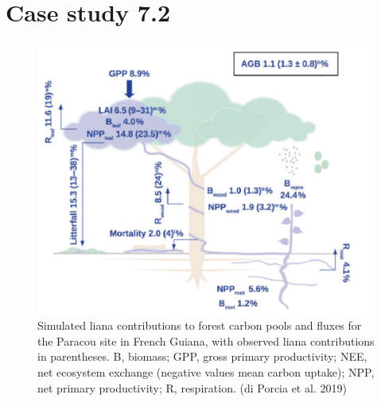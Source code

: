\documentclass[12pt,oneside]{book}
\begin{document}
\section{Case study 7.2}\label{case-study-7.2}

\begin{figure}

{\centering \includegraphics[width=0.8\linewidth]{figures/chap7/f722_porcia1} 

}

\caption{Simulated liana contributions to forest carbon pools and fluxes for the Paracou site in French Guiana, with observed liana contributions in parentheses. B, biomass; GPP, gross primary productivity; NEE, net ecosystem exchange (negative values mean carbon uptake); NPP, net primary productivity; R, respiration. (di Porcia et al. 2019) }\label{fig:f722}
\end{figure}
\end{document}
